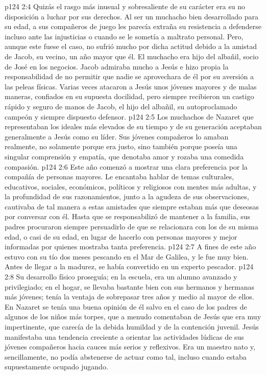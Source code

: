 \vs p124 2:4 \pc Quizás el rasgo más inusual y sobresaliente de su carácter era su no disposición a luchar por sus derechos. Al ser un muchacho bien desarrollado para su edad, a sus compañeros de juego les parecía extraña su resistencia a defenderse incluso ante las injusticias o cuando se le sometía a maltrato personal. Pero, aunque este fuese el caso, no sufrió mucho por dicha actitud debido a la amistad de Jacob, su vecino, un año mayor que él. El muchacho era hijo del albañil, socio de José en los negocios. Jacob admiraba mucho a Jesús e hizo propia la responsabilidad de no permitir que nadie se aprovechara de él por su aversión a las peleas físicas. Varias veces atacaron a Jesús unos jóvenes mayores y de malas maneras, confiados en su supuesta docilidad, pero siempre recibieron un castigo rápido y seguro de manos de Jacob, el hijo del albañil, su autoproclamado campeón y siempre dispuesto defensor.
\vs p124 2:5 Los muchachos de Nazaret que representaban los ideales más elevados de su tiempo y de su generación aceptaban generalmente a Jesús como su líder. Sus jóvenes compañeros lo amaban realmente, no solamente porque era justo, sino también porque poseía una singular comprensión y empatía, que denotaba amor y rozaba una comedida compasión.
\vs p124 2:6 Este año comenzó a mostrar una clara preferencia por la compañía de personas mayores. Le encantaba hablar de temas culturales, educativos, sociales, económicos, políticos y religiosos con mentes más adultas, y la profundidad de sus razonamientos, junto a la agudeza de sus observaciones, cautivaba de tal manera a estas amistades que siempre estaban más que deseosas por conversar con él. Hasta que se responsabilizó de mantener a la familia, sus padres procuraron siempre persuadirlo de que se relacionara con los de su misma edad, o casi de su edad, en lugar de hacerlo con personas mayores y mejor informadas por quienes mostraba tanta preferencia.
\vs p124 2:7 A fines de este año estuvo con su tío dos meses pescando en el Mar de Galilea, y le fue muy bien. Antes de llegar a la madurez, se había convertido en un experto pescador.
\vs p124 2:8 Su desarrollo físico proseguía; en la escuela, era un alumno avanzado y privilegiado; en el hogar, se llevaba bastante bien con sus hermanos y hermanas más jóvenes; tenía la ventaja de sobrepasar tres años y medio al mayor de ellos. En Nazaret se tenía una buena opinión de él salvo en el caso de los padres de algunos de los niños más torpes, que a menudo comentaban de Jesús que era muy impertinente, que carecía de la debida humildad y de la contención juvenil. Jesús manifestaba una tendencia creciente a orientar las actividades lúdicas de sus jóvenes compañeros hacia cauces más serios y reflexivos. Era un maestro nato y, sencillamente, no podía abstenerse de actuar como tal, incluso cuando estaba supuestamente ocupado jugando.
